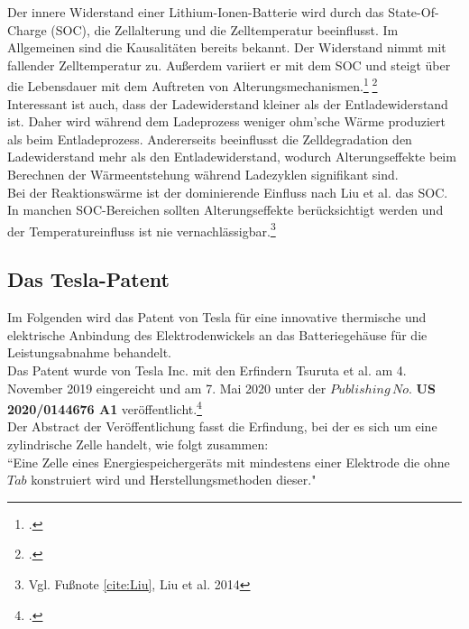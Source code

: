 Der innere Widerstand einer Lithium-Ionen-Batterie wird durch das State-Of-Charge (SOC), die Zellalterung und die Zelltemperatur beeinflusst. Im Allgemeinen sind die Kausalitäten bereits bekannt. Der Widerstand nimmt mit fallender Zelltemperatur zu. Außerdem variiert er mit dem SOC und steigt über die Lebensdauer mit dem Auftreten von Alterungsmechanismen.\footcite[Vgl.][]{Andre.2011}$\;$\footcite[Vgl.][]{Ecker.2012}\\
Interessant ist auch, dass der Ladewiderstand kleiner als der Entladewiderstand ist. Daher wird während dem Ladeprozess weniger ohm'sche Wärme produziert als beim Entladeprozess. Andererseits beeinflusst die Zelldegradation den Ladewiderstand mehr als den Entladewiderstand, wodurch Alterungseffekte beim Berechnen der Wärmeentstehung während Ladezyklen signifikant sind.\\
Bei der Reaktionswärme ist der dominierende Einfluss nach Liu et al. das SOC. In manchen SOC-Bereichen sollten Alterungseffekte berücksichtigt werden und der Temperatureinfluss ist nie vernachlässigbar.\footnote{Vgl. Fußnote \ref{cite:Liu}, Liu et al. 2014}

\newpage
\subsection{Das Tesla-Patent}

Im Folgenden wird das Patent von Tesla für eine innovative thermische und elektrische Anbindung des Elektrodenwickels an das Batteriegehäuse für die Leistungsabnahme behandelt.\\
Das Patent wurde von Tesla Inc. mit den Erfindern Tsuruta et al. am 4. November 2019 eingereicht und am 7. Mai 2020 unter der $Publishing\,No.$ \textbf{US 2020/0144676 A1} veröffentlicht.\footcite[Vgl.\label{cite:TeslaPatent}][]{TsurutaTesla2020}\\
Der Abstract der Veröffentlichung fasst die Erfindung, bei der es sich um eine zylindrische Zelle handelt, wie folgt zusammen: \\
``Eine Zelle eines Energiespeichergeräts mit mindestens einer Elektrode die ohne $Tab$ konstruiert wird und Herstellungsmethoden dieser."\\

